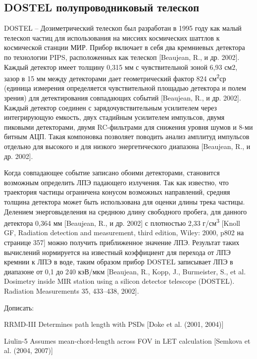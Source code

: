 \documentclass[a4paper,portrait,12pt]{article}
\begin{document}
{{{{\subsection*{	\textbf{DOSTEL полупроводниковый телескоп}}

DOSTEL -- Дозиметрический телескоп был разработан в 1995 году как малый телескоп частиц для использования на миссиях космических шаттлов к космической станции МИР. Прибор включает в себя два кремниевых детектора по технологии PIPS, расположенных как телескоп [Beaujean, R., и др. 2002]. Каждый детектор имеет толщину 0,315 мм с чувствительной зоной 6,93 см2, зазор в 15 мм между детекторами дает геометрический фактор 824 см\textsuperscript{2}ср (единица измерения определяется чувствительной площадью детектора и полем зрения) для детектирования совпадающих событий [Beaujean, R., и др. 2002]. Каждый детектор соединен с зарядочувствительным усилителем через интегрирующую емкость, двух стадийным усилителем импульсов, двумя пиковыми детекторами, двумя RC-фильтрами для снижения уровня шумов и 8-ми битным АЦП. Такая компоновка позволяет поводить анализ амплитуд импульсов отдельно для высокого и для низкого энергетического диапазона [Beaujean, R., и др. 2002].


Когда совпадающее событие записано обоими детекторами, становится возможным определить ЛПЭ падающего излучения. Так как известно, что траектория частицы ограничена конусом возможных направлений, средняя толщина детектора может быть использована для оценки длины трека частицы. Делением энерговыделения на среднюю длину свободного пробега, для данного детектора 0,364 мм [Beaujean, R., и др. 2002] с плотностью 2,33 г/см\textsuperscript{3} [Knoll GF, Radiation detection and measurement, third edition, Wiley: 2000, p802  на странице 357]  можно получить приближенное значение ЛПЭ. Результат таких вычислений нормируется на известный коэффициент для перехода от ЛПЭ кремнии к ЛПЭ в воде, таким образом прибор DOSTEL записывает ЛПЭ в диапазоне от 0,1 до 240 кэВ/мкм [Beaujean, R., Kopp, J., Burmeister, S., et al. Dosimetry inside MIR station using a silicon detector telescope (DOSTEL). Radiation Measurements 35, 433--438, 2002].





\colorbox[rgb]{1.000,0.000,0.000}{Дописать}\colorbox[rgb]{1.000,0.000,0.000}{:}


RRMD-III Determines path length with PSDs [Doke et al. (2001, 2004)]


Liulin-5 Assumes mean-chord-length across FOV in LET calculation [Semkova et al. (2004, 2007)]


}}}}
\end{document}
